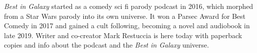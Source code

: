 \textit{Best in Galaxy} started as a comedy sci fi parody podcast in 2016,
which morphed from a Star Wars parody into its own universe. It won a
Parsec Award for Best Comedy in 2017 and gained a cult following,
becoming a novel and audiobook in late 2019. Writer and co-creator
Mark Restuccia is here today with paperback copies and info about
the podcast and the \textit{Best in Galaxy} universe.
